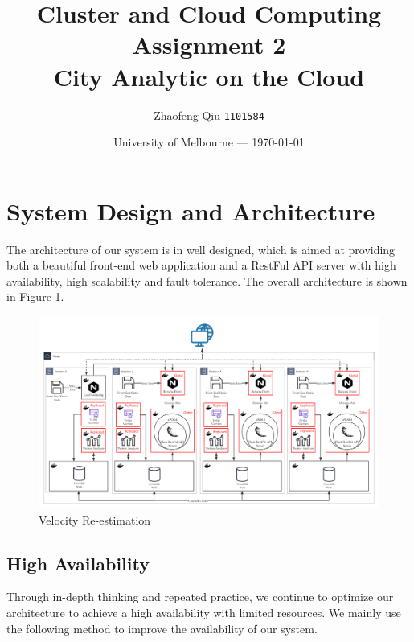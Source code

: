 \documentclass{article}
\title{Cluster and Cloud Computing Assignment 2
		\\ City Analytic on the Cloud} %
\author{ Zhaofeng Qiu \texttt{1101584}} %
\date{University of Melbourne --- \today} %
\begin{document}
\maketitle %


\section{System Design and Architecture}
The architecture of our system is in well designed, which is aimed at providing both a beautiful front-end web application and a RestFul API server with high availability, high scalability and fault tolerance. The overall architecture is shown in Figure \ref{fig:systemArchitecturePsystemArchitecture}. 

\begin{figure}[htp]
\centering
\includegraphics[width=\textwidth]{img/systemStructure.png}
\caption{Velocity Re-estimation}
\label{fig:systemArchitecturePsystemArchitecture}
\end{figure}

\subsection{High Availability}
Through in-depth thinking and repeated practice, we continue to optimize our architecture to achieve a high availability with limited resources. We mainly use the following method to improve the availability of our system.
\end{document}
